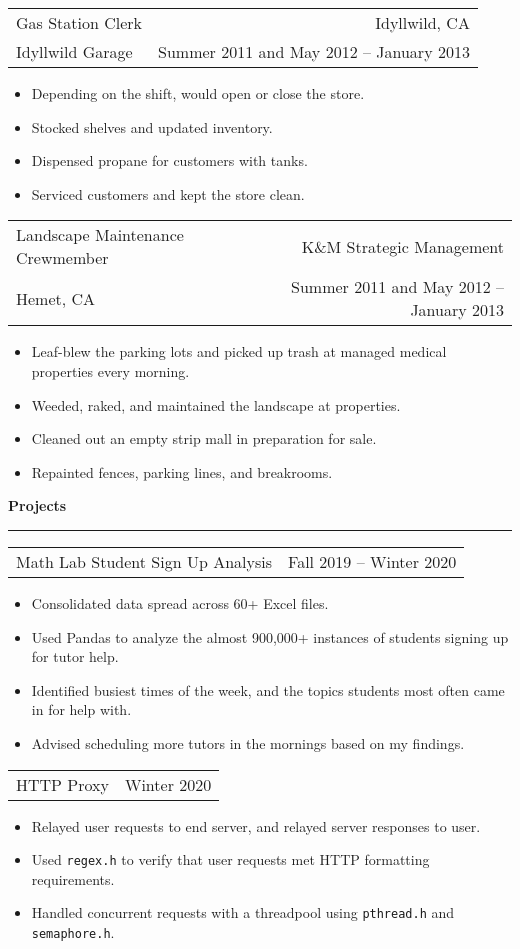 \documentclass{article}
\newenvironment{compactItemize}{
  \begin{itemize}[itemsep=0ex, parsep=0ex, partopsep=0ex, topsep= -7pt]
}{
  \end{itemize}
}
\newcommand{\jobInfo}[4]{
  \begingroup
  \setlength{\tabcolsep}{0ex}
  \begin{tabularx}{\linewidth}{X r}
    #1 & %
    #2\\ %
    #3 & %
    #4   %
  \end{tabularx}%
  \endgroup%
}
\newcommand{\project}[2]{
  \begingroup
  \setlength{\tabcolsep}{0ex}
  \begin{tabularx}{\linewidth}{X r}
    #1 & %
    #2\\ %
  \end{tabularx}%
  \endgroup%
}
\begin{document}
\jobInfo{Gas Station Clerk}{Idyllwild, CA}{Idyllwild Garage}{Summer 2011 and May 2012 -- January 2013}
\begin{compactItemize}
  \item Depending on the shift, would open or close the store.
  \item Stocked shelves and updated inventory.
  \item Dispensed propane for customers with tanks.
  \item Serviced customers and kept the store clean.
\end{compactItemize}
\medskip

\jobInfo{Landscape Maintenance Crewmember}{K\&M Strategic Management}{Hemet, CA}{Summer 2011 and May 2012 -- January 2013}
\begin{compactItemize}
  \item Leaf-blew the parking lots and picked up trash at managed medical properties every morning.
  \item Weeded, raked, and maintained the landscape at properties.
  \item Cleaned out an empty strip mall in preparation for sale.
  \item Repainted fences, parking lines, and breakrooms.
\end{compactItemize}
\medskip

\textbf{Projects %
}
\smallskip
\hrule

\project{Math Lab Student Sign Up Analysis}{Fall 2019 -- Winter 2020}
\begin{compactItemize}
  \item Consolidated data spread across 60+ Excel files.
  \item Used Pandas to analyze the almost 900,000+ instances of students signing up for tutor help.
  \item Identified busiest times of the week, and the topics students most often came in for help with.
  \item Advised scheduling more tutors in the mornings based on my findings.
\end{compactItemize}
\medskip

\project{HTTP Proxy}{Winter 2020}
\begin{compactItemize}
  \item Relayed user requests to end server, and relayed server responses to user.
  \item Used \texttt{regex.h} to verify that user requests met HTTP formatting requirements.
  \item Handled concurrent requests with a threadpool using \texttt{pthread.h} and \texttt{semaphore.h}.
\end{compactItemize}
\medskip
\end{document}
